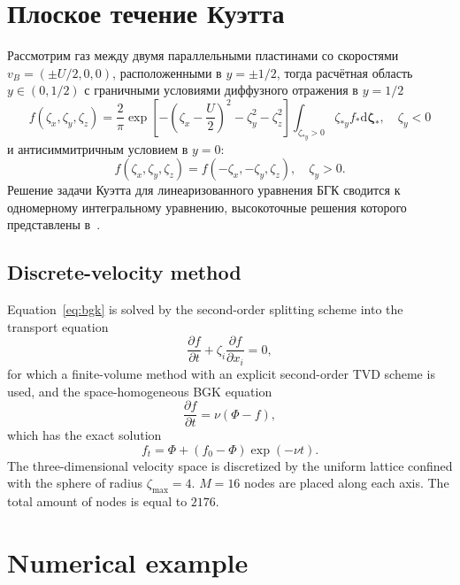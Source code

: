 \documentclass{article}
\theoremstyle{plain}
\newcommand{\dd}{\mathrm{d}}
\newcommand{\pder}[2][]{\frac{\partial#1}{\partial#2}}
\newcommand{\dzeta}{\boldsymbol{\dd\zeta}}
\begin{document}
\section{Плоское течение Куэтта}

Рассмотрим газ между двумя параллельными пластинами со скоростями \(v_B = (\pm{U}/2,0,0)\),
расположенными в \(y=\pm1/2\), тогда расчётная область \(y\in(0,1/2)\) с граничными условиями
диффузного отражения в \(y=1/2\)
\begin{equation}\label{eq:diffuse}
    f(\zeta_x,\zeta_y,\zeta_z) = \frac2{\pi} \exp\left[-\left(\zeta_x-\frac{U}{2}\right)^2-\zeta_y^2-\zeta_z^2\right]
        \int_{\zeta_{*y}>0}\zeta_{*y} f_* \dzeta_*, \quad \zeta_y<0
\end{equation}
и антисиммитричным условием в \(y=0\):
\begin{equation}\label{eq:antisymmetry}
    f(\zeta_x,\zeta_y,\zeta_z) = f(-\zeta_x,-\zeta_y,\zeta_z), \quad \zeta_y>0.
\end{equation}
Решение задачи Куэтта для линеаризованного уравнения БГК сводится к одномерному интегральному уравнению,
высокоточные решения которого представлены в~\cite{Luo2015, Luo2016}.

\subsection{Discrete-velocity method}

Equation~\eqref{eq:bgk} is solved by the second-order splitting scheme into the transport equation
\begin{equation}\label{eq:split_transport}
    \pder[f]{t} + \zeta_i\pder[f]{x_i} = 0,
\end{equation}
for which a finite-volume method with an explicit second-order TVD scheme is used,
and the space-homogeneous BGK equation
\begin{equation}\label{eq:homogeneous}
    \pder[f]{t} = \nu (\Phi-f),
\end{equation}
which has the exact solution
\begin{equation}\label{eq:exact_bgk}
    f_t = \Phi + (f_0-\Phi)\exp(-\nu t).
\end{equation}
The three-dimensional velocity space is discretized by the uniform lattice confined with the sphere of radius \(\zeta_{\max}=4\).
\(M=16\) nodes are placed along each axis. The total amount of nodes is equal to \(2176\).

\section{Numerical example}
\end{document}
